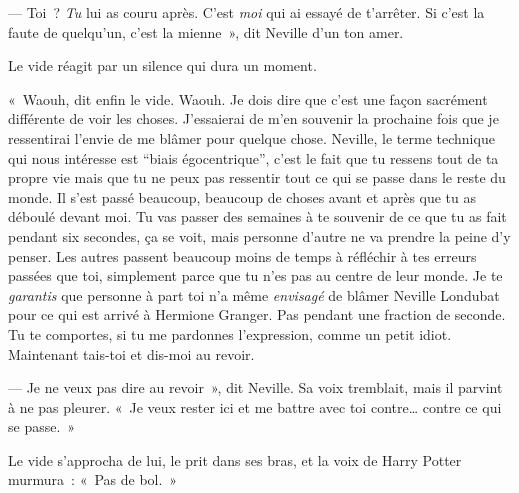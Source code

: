 --- Toi~? \emph{Tu} lui as couru après. C'est \emph{moi} qui ai essayé de t'arrêter. Si c'est la faute de quelqu'un, c'est la mienne~», dit Neville d'un ton amer.

Le vide réagit par un silence qui dura un moment.

«~Waouh, dit enfin le vide. Waouh. Je dois dire que c'est une façon sacrément différente de voir les choses. J'essaierai de m'en souvenir la prochaine fois que je ressentirai l'envie de me blâmer pour quelque chose. Neville, le terme technique qui nous intéresse est “biais égocentrique”, c'est le fait que tu ressens tout de ta propre vie mais que tu ne peux pas ressentir tout ce qui se passe dans le reste du monde. Il s'est passé beaucoup, beaucoup de choses avant et après que tu as déboulé devant moi. Tu vas passer des semaines à te souvenir de ce que tu as fait pendant six secondes, ça se voit, mais personne d'autre ne va prendre la peine d'y penser. Les autres passent beaucoup moins de temps à réfléchir à tes erreurs passées que toi, simplement parce que tu n'es pas au centre de leur monde. Je te \emph{garantis} que personne à part toi n'a même \emph{envisagé} de blâmer Neville Londubat pour ce qui est arrivé à Hermione Granger. Pas pendant une fraction de seconde. Tu te comportes, si tu me pardonnes l'expression, comme un petit idiot. Maintenant tais-toi et dis-moi au revoir.

--- Je ne veux pas dire au revoir~», dit Neville. Sa voix tremblait, mais il parvint à ne pas pleurer. «~Je veux rester ici et me battre avec toi contre… contre ce qui se passe.~»

Le vide s'approcha de lui, le prit dans ses bras, et la voix de Harry Potter murmura~: «~Pas de bol.~»
